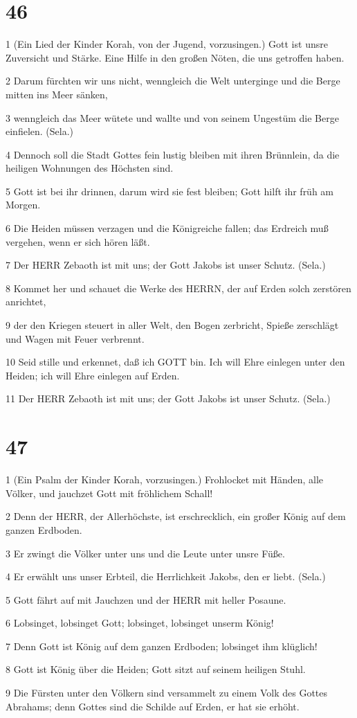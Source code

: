 \chapter{46}

\par 1 (Ein Lied der Kinder Korah, von der Jugend, vorzusingen.) Gott ist unsre Zuversicht und Stärke. Eine Hilfe in den großen Nöten, die uns getroffen haben.
\par 2 Darum fürchten wir uns nicht, wenngleich die Welt unterginge und die Berge mitten ins Meer sänken,
\par 3 wenngleich das Meer wütete und wallte und von seinem Ungestüm die Berge einfielen. (Sela.)
\par 4 Dennoch soll die Stadt Gottes fein lustig bleiben mit ihren Brünnlein, da die heiligen Wohnungen des Höchsten sind.
\par 5 Gott ist bei ihr drinnen, darum wird sie fest bleiben; Gott hilft ihr früh am Morgen.
\par 6 Die Heiden müssen verzagen und die Königreiche fallen; das Erdreich muß vergehen, wenn er sich hören läßt.
\par 7 Der HERR Zebaoth ist mit uns; der Gott Jakobs ist unser Schutz. (Sela.)
\par 8 Kommet her und schauet die Werke des HERRN, der auf Erden solch zerstören anrichtet,
\par 9 der den Kriegen steuert in aller Welt, den Bogen zerbricht, Spieße zerschlägt und Wagen mit Feuer verbrennt.
\par 10 Seid stille und erkennet, daß ich GOTT bin. Ich will Ehre einlegen unter den Heiden; ich will Ehre einlegen auf Erden.
\par 11 Der HERR Zebaoth ist mit uns; der Gott Jakobs ist unser Schutz. (Sela.)

\chapter{47}

\par 1 (Ein Psalm der Kinder Korah, vorzusingen.) Frohlocket mit Händen, alle Völker, und jauchzet Gott mit fröhlichem Schall!
\par 2 Denn der HERR, der Allerhöchste, ist erschrecklich, ein großer König auf dem ganzen Erdboden.
\par 3 Er zwingt die Völker unter uns und die Leute unter unsre Füße.
\par 4 Er erwählt uns unser Erbteil, die Herrlichkeit Jakobs, den er liebt. (Sela.)
\par 5 Gott fährt auf mit Jauchzen und der HERR mit heller Posaune.
\par 6 Lobsinget, lobsinget Gott; lobsinget, lobsinget unserm König!
\par 7 Denn Gott ist König auf dem ganzen Erdboden; lobsinget ihm klüglich!
\par 8 Gott ist König über die Heiden; Gott sitzt auf seinem heiligen Stuhl.
\par 9 Die Fürsten unter den Völkern sind versammelt zu einem Volk des Gottes Abrahams; denn Gottes sind die Schilde auf Erden, er hat sie erhöht.


